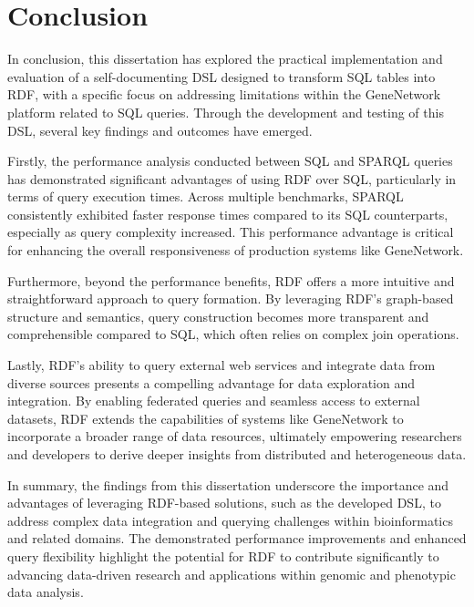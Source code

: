 \chapter{Conclusion}

In conclusion, this dissertation has explored the practical implementation and evaluation of a self-documenting DSL designed to transform SQL tables into RDF, with a specific focus on addressing limitations within the GeneNetwork platform related to SQL queries. Through the development and testing of this DSL, several key findings and outcomes have emerged.

Firstly, the performance analysis conducted between SQL and SPARQL queries has demonstrated significant advantages of using RDF over SQL, particularly in terms of query execution times. Across multiple benchmarks, SPARQL consistently exhibited faster response times compared to its SQL counterparts, especially as query complexity increased. This performance advantage is critical for enhancing the overall responsiveness of production systems like GeneNetwork.

Furthermore, beyond the performance benefits, RDF offers a more intuitive and straightforward approach to query formation. By leveraging RDF's graph-based structure and semantics, query construction becomes more transparent and comprehensible compared to SQL, which often relies on complex join operations.

Lastly, RDF's ability to query external web services and integrate data from diverse sources presents a compelling advantage for data exploration and integration. By enabling federated queries and seamless access to external datasets, RDF extends the capabilities of systems like GeneNetwork to incorporate a broader range of data resources, ultimately empowering researchers and developers to derive deeper insights from distributed and heterogeneous data.

In summary, the findings from this dissertation underscore the importance and advantages of leveraging RDF-based solutions, such as the developed DSL, to address complex data integration and querying challenges within bioinformatics and related domains. The demonstrated performance improvements and enhanced query flexibility highlight the potential for RDF to contribute significantly to advancing data-driven research and applications within genomic and phenotypic data analysis.
